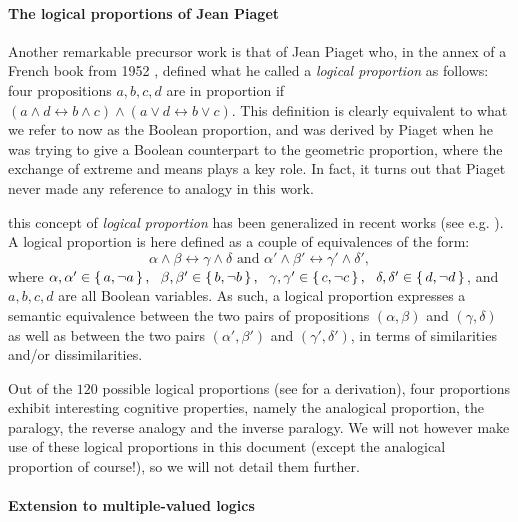 \paragraph{The logical proportions of Jean Piaget\\}
Another remarkable precursor work is that of Jean Piaget who, in the annex of a
French book from 1952 \cite{Pia52}, defined what he called a \textit{logical
proportion} as follows: four propositions $a, b, c,d$ are in proportion if $(a
\wedge d \leftrightarrow b \wedge c) \wedge (a \vee  d \leftrightarrow b \vee
c)$. This definition is clearly equivalent to what we refer to now as the
Boolean proportion, and was derived by Piaget when he was trying to give a
Boolean counterpart to the geometric proportion, where the exchange of extreme
and means plays a key role. In fact, it turns out that Piaget never made any
reference to analogy in this work.

this concept of \textit{logical proportion} has been generalized in recent
works (see e.g. \cite{PraRic14}). A logical proportion is here defined as a
couple of equivalences of the form:
$$\alpha \wedge \beta \leftrightarrow  \gamma \wedge \delta \text{ and }
\alpha' \wedge \beta' \leftrightarrow  \gamma' \wedge \delta',$$
where $\alpha, \alpha' \in \set{a, \neg a}, ~~ \beta, \beta' \in \set{b, \neg
b}, ~~ \gamma, \gamma' \in \set{c, \neg c}, ~~\delta, \delta' \in \set{d, \neg
d}$, and $a, b, c, d$ are all Boolean variables. As such, a logical proportion
expresses a semantic equivalence between the two pairs of propositions
$(\alpha, \beta)$ and $(\gamma, \delta)$ as well as between the two pairs
$(\alpha', \beta')$ and $(\gamma', \delta')$, in terms of similarities and/or
dissimilarities.

Out of the $120$ possible logical proportions (see \cite{PraRic12} for a
derivation), four proportions exhibit interesting cognitive properties, namely
the analogical proportion, the paralogy, the reverse analogy and the inverse
paralogy. We will not however make use of these logical proportions in this
document (except the analogical proportion of course!), so we will not detail
them further.

\paragraph{Extension to multiple-valued logics\\}

